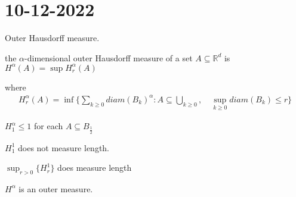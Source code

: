 \section{10-12-2022}


Outer Hausdorff measure.

the $\alpha$-dimensional outer Hausdorff measure of a set $A \subseteq \mathbb{R}^d$ is $H^{\alpha} (A) = \sup H_{r}^{\alpha} (A)$ 

where
\begin{align*}
	H_{r}^{\alpha} (A) = \inf\{ \sum_{k \geq 0} diam (B_k)^{\alpha} : A \subseteq \bigcup_{k \geq 0}, \quad \sup_{k \geq 0} diam (B_{k} ) \leq r \}
\end{align*}

\begin{example}
	$H_{1}^{\alpha} \leq 1$ for each $A \subseteq B_{\frac{1}{2}}$ 

	$H_{1}^{1}$ does not measure length.

	$\sup_{r > 0} \{H_{r}^{1}\}$ does measure length
\end{example}

\begin{lemma}
	$H^{\alpha}$ is an outer measure.
\end{lemma}

